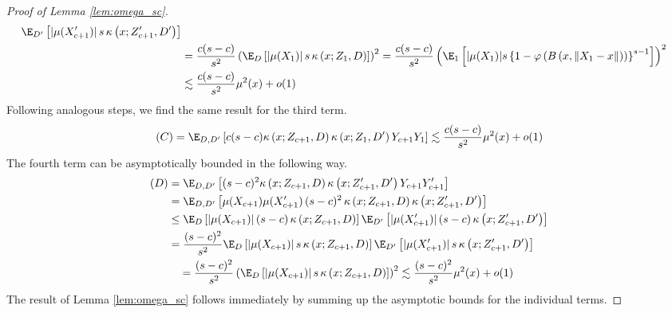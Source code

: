 \begin{proof}[Proof of Lemma \ref{lem:omega_sc}]
\begin{equation}
\begin{aligned}
			\E_{D^{\prime}}\left[|\mu(X_{c+1}^{\prime})| \, s \, \kappa\left(x; Z_{c+1}^{\prime}, D^{\prime}\right)\right]                                                                                   \\
			 & = \frac{c (s-c)}{s^2} \left(\E_{D}\left[|\mu(X_1)| \, s \, \kappa\left(x; Z_{1}, D\right)\right]\right)^2                                                                       
			= \frac{c (s-c)}{s^2} \left(\E_{1}\left[|\mu(X_1)| s\left\{1 - \varphi\left(B\left(x, \|X_1 - x\|\right)\right)\right\}^{s-1}\right]\right)^2                          \\
			 & \lesssim \frac{c(s-c)}{s^2}\mu^2(x) + o(1)
		\end{aligned}
	\end{equation}
	Following analogous steps, we find the same result for the third term.
	\begin{equation}
		\begin{aligned}
			(C)
            = \E_{D, D^{\prime}}\left[c(s-c) \kappa\left(x; Z_{c+1}, D\right)\kappa\left(x; Z_{1}, D^{\prime}\right)Y_{c+1}Y_{1}\right]
			\lesssim \frac{c(s-c)}{s^2}\mu^2(x) + o(1)
		\end{aligned}
	\end{equation}
	The fourth term can be asymptotically bounded in the following way.
	\begin{equation}
		\begin{aligned}
			(D)
            & = \E_{D, D^{\prime}}\left[(s-c)^2 \kappa\left(x; Z_{c+1}, D\right)\kappa\left(x; Z_{c+1}^{\prime}, D^{\prime}\right)Y_{c+1}Y_{c+1}^{\prime}\right]                                           \\
			 & = \E_{D, D^{\prime}}\left[\mu(X_{c+1})\mu(X_{c+1}^{\prime})\, (s-c)^2 \, \kappa\left(x; Z_{c+1}, D\right)\kappa\left(x; Z_{c+1}^{\prime}, D^{\prime}\right)\right] \\
			 & \leq \E_{D}\left[|\mu(X_{c+1})|\, (s-c) \, \kappa\left(x; Z_{c+1}, D\right)\right]
			\E_{D^{\prime}}\left[|\mu(X_{c+1}^{\prime})|\, (s-c) \, \kappa\left(x; Z_{c+1}^{\prime}, D^{\prime}\right)\right]                                                                                      \\
			 & = \frac{(s-c)^2}{s^2} \E_{D}\left[|\mu(X_{c+1})|\, s \, \kappa\left(x; Z_{c+1}, D\right)\right]
			\E_{D^{\prime}}\left[|\mu(X_{c+1}^{\prime})|\, s \, \kappa\left(x; Z_{c+1}^{\prime}, D^{\prime}\right)\right]                                                                                          \\
			 & \quad = \frac{(s-c)^2}{s^2} \left(\E_{D}\left[|\mu(X_{c+1})|\, s \, \kappa\left(x; Z_{c+1}, D\right)\right]\right)^2                                                                        
			\lesssim \frac{(s-c)^2}{s^2}\mu^2(x) + o(1)
		\end{aligned}
	\end{equation}
	The result of Lemma \ref{lem:omega_sc} follows immediately by summing up the asymptotic bounds for the individual terms.
\end{proof}

